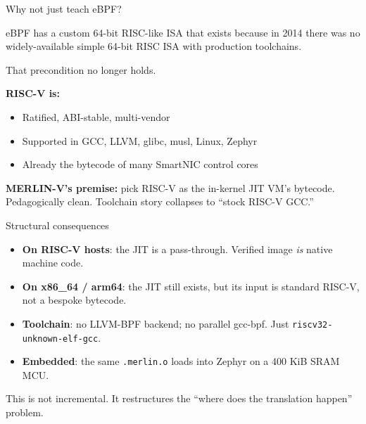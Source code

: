 \documentclass[aspectratio=169,11pt]{beamer}
\begin{document}
\begin{frame}{Why not just teach eBPF?}

eBPF has a custom 64-bit RISC-like ISA that exists because in
2014 there was no widely-available simple 64-bit RISC ISA with
production toolchains.

\pause

That precondition no longer holds.

\textbf{RISC-V is:}
\begin{itemize}
  \item Ratified, ABI-stable, multi-vendor
  \item Supported in GCC, LLVM, glibc, musl, Linux, Zephyr
  \item Already the bytecode of many SmartNIC control cores
\end{itemize}

\pause

\textbf{MERLIN-V's premise:} pick RISC-V as the in-kernel
JIT VM's bytecode.  Pedagogically clean.  Toolchain story
collapses to ``stock RISC-V GCC.''

\end{frame}

\begin{frame}{Structural consequences}

\begin{itemize}
  \item \textbf{On RISC-V hosts}: the JIT is a pass-through.
        Verified image \emph{is} native machine code.
  \item \textbf{On x86\_64 / arm64}: the JIT still exists, but
        its input is standard RISC-V, not a bespoke bytecode.
  \item \textbf{Toolchain}: no LLVM-BPF backend; no parallel
        gcc-bpf.  Just \texttt{riscv32-unknown-elf-gcc}.
  \item \textbf{Embedded}: the same \texttt{.merlin.o} loads
        into Zephyr on a 400 KiB SRAM MCU.
\end{itemize}

\pause

This is not incremental.  It restructures the
``where does the translation happen'' problem.

\end{frame}
\end{document}

